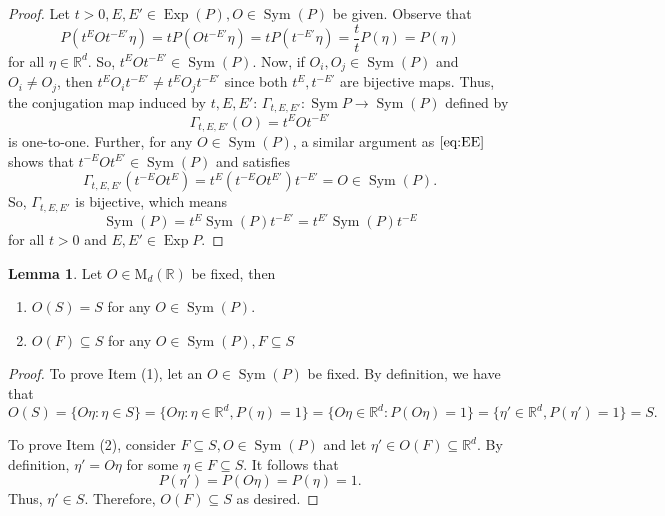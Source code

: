 \documentclass{article}
\theoremstyle{definition}
\newcommand\MdR{\mbox{M}_d(\mathbb{R})}
\newcommand\Sym{\operatorname{Sym}}
\newcommand\Exp{\operatorname{Exp}}
\newcommand{\R}{\mathbb{R}}
\newcommand{\f}[2]{\frac{#1}{#2}}
\theoremstyle{theorem}
\newtheorem{lemma}[theorem]{Lemma}
\begin{document}
\begin{proof}
Let $t>0, E,E'\in \Exp{(P)}, O\in \Sym(P)$ be given. Observe that
\begin{equation}\label{eq:EE}
    P(t^E O t^{-E'} \eta) = tP(Ot^{-E'}\eta) = tP(t^{-E'}\eta) = \f{t}{t}P(\eta)= P(\eta)
\end{equation}
for all $\eta\in \R^d$. So, $t^E O t^{-E'} \in \Sym(P)$. Now, if $O_i,O_j\in \Sym(P)$ and $O_i\neq O_j$, then $t^E O_i t^{-E'} \neq t^E O_j t^{-E'}$ since both $t^{E}, t^{-E'}$ are bijective maps. Thus, the conjugation map induced by $t,E,E'$: $\Gamma_{t,E,E'} : \Sym{P} \to \Sym{(P)}$ defined by
\begin{equation*}
    \Gamma_{t,E,E'}(O) = t^E O t^{-E'}
\end{equation*}
is one-to-one. Further, for any $O\in \Sym(P)$, a similar argument as $\eqref{eq:EE}$ shows that $t^{-E}Ot^{E'}\in \Sym(P)$ and satisfies 
\begin{equation*}
    \Gamma_{t,E,E'}(t^{-E}Ot^E) = t^E(t^{-E}O t^{E'})t^{-E'} = O\in \Sym{(P)}.
\end{equation*}
So, $\Gamma_{t,E,E'}$ is bijective, which means 
\begin{equation*}
    \Sym{(P)} = t^{E} \Sym{(P)} t^{-E'} = t^{E'} \Sym{(P)} t^{-E}
\end{equation*}
for all $t>0$ and $E,E'\in \Exp{P}$.
\end{proof}


\begin{lemma}\label{lem:S}
Let $O\in \MdR{}$ be fixed, then 
\begin{enumerate}
    \item $O(S) = S$ for any $O\in \Sym(P)$.
    \item $O(F)\subseteq S$ for any $O\in \Sym{(P)}, F\subseteq S$
\end{enumerate}
\end{lemma}

\begin{proof}
To prove Item (1), let an $O\in \Sym(P)$ be fixed. By definition, we have that
\begin{equation*}
    O(S) = \{ O \eta : \eta \in S \}=\{ O \eta : \eta\in \R^d, P(\eta) = 1 \} = \{ O \eta \in \R^d: P(O\eta) = 1 \} = \{  \eta'\in \R^d, P(\eta') = 1 \} = S.
\end{equation*}


To prove Item (2), consider $F\subseteq S, O\in \Sym{(P)}$ and let $\eta' \in O(F) \subseteq \R^d$. By definition, $\eta' = O\eta$ for some $\eta\in F\subseteq S$. It follows that 
\begin{equation*}
    P(\eta') = P(O\eta) = P(\eta) = 1.
\end{equation*}
Thus, $\eta' \in S$. Therefore, $O(F)\subseteq S$ as desired. 

\end{proof}
\end{document}
